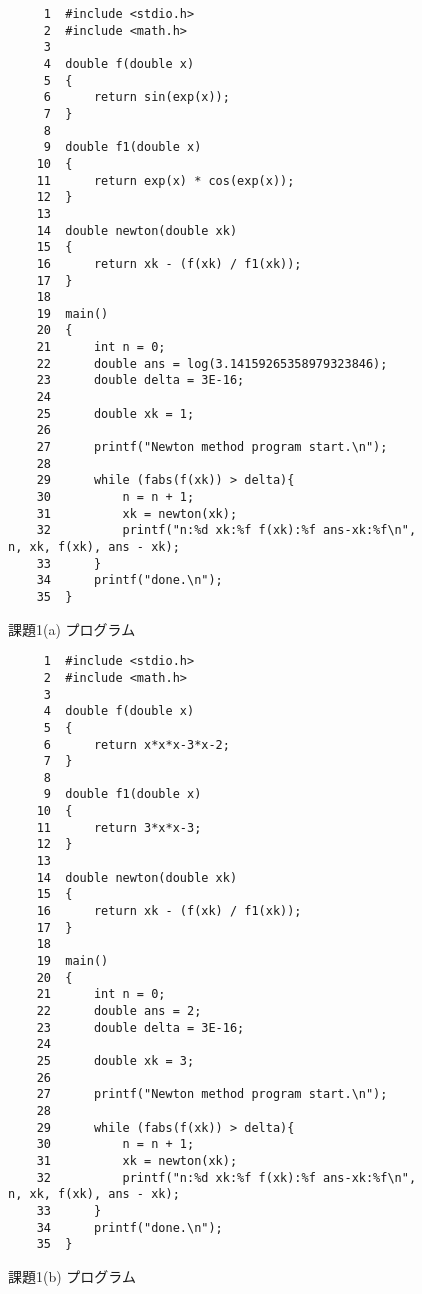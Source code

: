 \documentclass[12pt]{jarticle}
\renewcommand  \[  {\begin{eqnarray}}
\renewcommand  \]  {\end{eqnarray}}
\begin{document}

\begin{figure}[t]
\begin{screen}
\footnotesize
\begin{verbatim}
     1	#include <stdio.h>
     2	#include <math.h> 
     3	
     4	double f(double x)
     5	{
     6	    return sin(exp(x));
     7	}
     8	
     9	double f1(double x)
    10	{
    11	    return exp(x) * cos(exp(x));
    12	}
    13	
    14	double newton(double xk)
    15	{
    16	    return xk - (f(xk) / f1(xk));
    17	}
    18	
    19	main()
    20	{
    21	    int n = 0;
    22	    double ans = log(3.14159265358979323846);
    23	    double delta = 3E-16;
    24	
    25	    double xk = 1;
    26	
    27	    printf("Newton method program start.\n");
    28	
    29	    while (fabs(f(xk)) > delta){
    30	        n = n + 1;
    31	        xk = newton(xk);
    32	        printf("n:%d xk:%f f(xk):%f ans-xk:%f\n", n, xk, f(xk), ans - xk);
    33	    }
    34	    printf("done.\n");
    35	}
\end{verbatim}
\end{screen}
\caption{課題1(a) プログラム}
\label{fig:p1a}
\end{figure}

\begin{figure}[t]
\begin{screen}
\footnotesize
\begin{verbatim}
     1	#include <stdio.h>
     2	#include <math.h> 
     3	
     4	double f(double x)
     5	{
     6	    return x*x*x-3*x-2;
     7	}
     8	
     9	double f1(double x)
    10	{
    11	    return 3*x*x-3;
    12	}
    13	
    14	double newton(double xk)
    15	{
    16	    return xk - (f(xk) / f1(xk));
    17	}
    18	
    19	main()
    20	{
    21	    int n = 0;
    22	    double ans = 2;
    23	    double delta = 3E-16;
    24	
    25	    double xk = 3;
    26	
    27	    printf("Newton method program start.\n");
    28	
    29	    while (fabs(f(xk)) > delta){
    30	        n = n + 1;
    31	        xk = newton(xk);
    32	        printf("n:%d xk:%f f(xk):%f ans-xk:%f\n", n, xk, f(xk), ans - xk);
    33	    }
    34	    printf("done.\n");
    35	}
\end{verbatim}
\end{screen}
\caption{課題1(b) プログラム}
\label{fig:p1b}
\end{figure}
\end{document}
